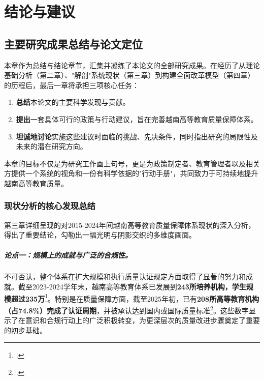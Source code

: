 \chapter{结论与建议}
\label{chap:ket_luan_khuyen_nghi}


\section{主要研究成果总结与论文定位}
\label{sec:tong_hop_ket_qua}

本章作为总结与结论章节，汇集并凝练了本论文的全部研究成果。在经历了从理论基础分析（第二章）、"解剖"系统现状（第三章）到构建全面改革模型（第四章）的历程后，最后一章将承担三项核心任务：
\begin{enumerate}
    \item \textbf{总结}本论文的主要科学发现与贡献。
    \item \textbf{提出}一套具体可行的政策与行动建议，旨在完善越南高等教育质量保障体系。
    \item \textbf{坦诚地讨论}实施这些建议时面临的挑战、先决条件，同时指出研究的局限性及未来的潜在研究方向。
\end{enumerate}

本章的目标不仅是为研究工作画上句号，更是为政策制定者、教育管理者以及相关方提供一个系统的视角和一份有科学依据的"行动手册"，共同致力于可持续地提升越南高等教育质量。

\subsection{现状分析的核心发现总结}
\label{subsec:tom_tat_phat_hien}

第三章详细呈现的对2015-2024年间越南高等教育质量保障体系现状的深入分析，得出了重要结论，勾勒出一幅光明与阴影交织的多维度画面。

\paragraph{论点一：规模上的成就与广泛的合规性。}
不可否认，整个体系在扩大规模和执行质量认证规定方面取得了显著的努力和成就。截至2023-2024学年末，越南高等教育体系已发展到\textbf{243所培养机构，学生规模超过235万}\footcite{thanhnien_quymo_2024}。特别是在质量保障方面，截至2025年初，已有\textbf{208所高等教育机构（占74.8\%）完成了认证周期}，并被承认达到国内或国际质量标准\footcite{dantri_kiemdinh_2025}。这些数字显示了在意识和合规行动上的广泛积极转变，为更深层次的质量改进步骤奠定了重要的初步基础。

